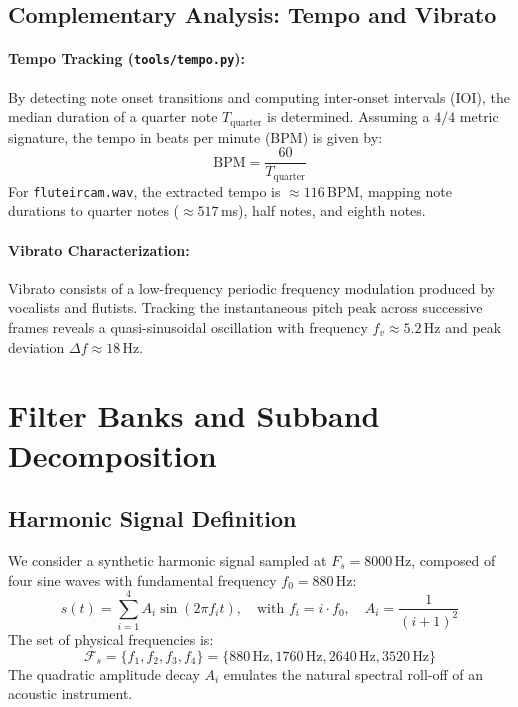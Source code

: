 \documentclass{rapportCS}
\begin{document}
\subsection{Complementary Analysis: Tempo and Vibrato}

\paragraph{Tempo Tracking (\texttt{tools/tempo.py}):}
By detecting note onset transitions and computing inter-onset intervals (IOI), the median duration of a quarter note $T_{\text{quarter}}$ is determined. Assuming a $4/4$ metric signature, the tempo in beats per minute (BPM) is given by:
\begin{equation}
    \text{BPM} = \frac{60}{T_{\text{quarter}}}
\end{equation}
For \texttt{fluteircam.wav}, the extracted tempo is $\approx 116$\,BPM, mapping note durations to quarter notes ($\approx 517$\,ms), half notes, and eighth notes.

\paragraph{Vibrato Characterization:}
Vibrato consists of a low-frequency periodic frequency modulation produced by vocalists and flutists. Tracking the instantaneous pitch peak across successive frames reveals a quasi-sinusoidal oscillation with frequency $f_v \approx 5.2$\,Hz and peak deviation $\Delta f \approx 18$\,Hz.

\section{Filter Banks and Subband Decomposition}

\subsection{Harmonic Signal Definition}
We consider a synthetic harmonic signal sampled at $F_s = 8000$\,Hz, composed of four sine waves with fundamental frequency $f_0 = 880$\,Hz:
\begin{equation}
    s(t) = \sum_{i=1}^{4} A_i \sin(2\pi f_i t), \quad \text{with } f_i = i \cdot f_0, \quad A_i = \frac{1}{(i+1)^2}
\end{equation}
The set of physical frequencies is:
\begin{equation}
    \mathcal{F}_s = \{f_1, f_2, f_3, f_4\} = \{880\,\text{Hz}, 1760\,\text{Hz}, 2640\,\text{Hz}, 3520\,\text{Hz}\}
\end{equation}
The quadratic amplitude decay $A_i$ emulates the natural spectral roll-off of an acoustic instrument.
\end{document}
